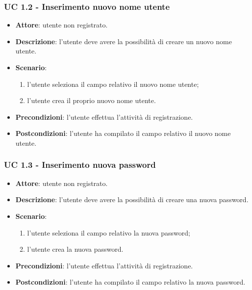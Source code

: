 \subsubsection{UC 1.2 - Inserimento nuovo nome utente}
\begin{itemize}
    \item \textbf{Attore}: utente non registrato.
    \item \textbf{Descrizione}: l’utente deve avere la possibilità di creare un nuovo nome utente.
    \item \textbf{Scenario}:
    \begin{enumerate}
        \item l’utente seleziona il campo relativo il nuovo nome utente;
        \item l’utente crea il proprio nuovo nome utente.
    \end{enumerate}
    \item \textbf{Precondizioni}: l’utente effettua l’attività di registrazione.
    \item \textbf{Postcondizioni}: l’utente ha compilato il campo relativo il nuovo nome utente.
\end{itemize}

\subsubsection{UC 1.3 - Inserimento nuova password}
\begin{itemize}
    \item \textbf{Attore}: utente non registrato.
    \item \textbf{Descrizione}: l’utente deve avere la possibilità di creare una nuova password.
    \item \textbf{Scenario}:
    \begin{enumerate}
        \item l’utente seleziona il campo relativo la nuova password;
        \item l’utente crea la nuova password.
    \end{enumerate}

    \item \textbf{Precondizioni}: l’utente effettua l’attività di registrazione.
    \item \textbf{Postcondizioni}: l’utente ha compilato il campo relativo la nuova password.
\end{itemize}


